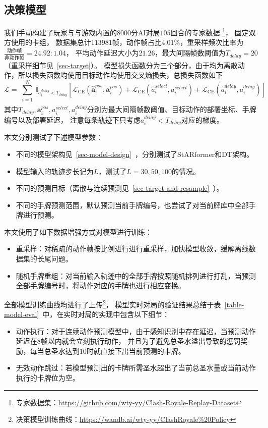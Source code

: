 \documentclass[openany,twoside,nofonts,AutoFakeBold,UTF8]{ctexbook}
\def\bd{\boldsymbol}        %
\begin{document}
\subsection{决策模型}\label{sec-decision-model}
我们手动构建了玩家与与游戏内置的$8000$分AI对局$105$回合的专家数据
\footnote{专家数据集：\url{https://github.com/wty-yy/Clash-Royale-Replay-Dataset}}，
固定双方使用的卡组，
数据集总计$113981$帧，动作帧占比$4.01\%$，重采样频次比率为$\frac{\text{动作帧}}{\text{非动作帧}}=24.92:1.04$，
平均动作延迟大小为$21.26$，最大间隔帧数阈值为$T_{delay}=20$（重采样细节见~\ref{sec-target}）。
模型损失函数分为三个部分，由于均为离散动作，所以损失函数均使用目标动作均使用交叉熵损失，总损失函数如下
\begin{equation}
  \mathcal{L} =
  \sum_{\substack{i=1\\}}^N\mathbb{I}_{a_i^{delay} < T_{delay}}\left[\mathcal{L}_{\text{CE}}(\hat{\bd{a}}_i^{pos}, \bd{a}_i^{pos})+
  \mathcal{L}_{\text{CE}}(\hat{a}_i^{select}, a_i^{select}) + 
  \mathcal{L}_{\text{CE}}(\hat{a}_i^{delay}, a_i^{delay})\right]
\end{equation}
其中$T_{delay},\bd{a}_i^{pos},a_i^{select},a_i^{delay}$分别为最大间隔帧数阈值、目标动作的部署坐标、手牌编号以及部署延迟，
注意每条轨迹下只考虑$a_i^{delay} < T_{delay}$对应的梯度。

本文分别测试了下述模型参数：
\begin{itemize}
  \item 不同的模型架构见~\ref{sec-model-design}~，分别测试了StARformer和DT架构。
  \item 模型输入的轨迹步长记为$L$，测试了$L=30,50,100$的情况。
  \item 不同的预测目标（离散与连续预测见~\ref{sec-target-and-resample}~）。
  \item 不同的手牌预测范围，默认预测当前手牌编号，也尝试了对当前牌库中全部手牌进行预测。
\end{itemize}

本文使用了如下数据增强方式对模型进行训练：
\begin{itemize}
  \item 重采样：对稀疏的动作帧按比例进行进行重采样，加快模型收敛，缓解离线数据集的长尾问题。
  \item 随机手牌重组：对当前输入轨迹中的全部手牌按照随机排列进行打乱，当预测全部手牌编号时，将动作对应的手牌也进行相应变换。
\end{itemize}

全部模型训练曲线均进行了上传\footnote{决策模型训练曲线：\url{https://wandb.ai/wty-yy/ClashRoyale\%20Policy}}，
模型实时对局的验证结果总结于表~\ref{table-model-eval}~中，在实时对局的实现中包含以下细节：
\begin{itemize}
  \item 动作执行：对于连续动作预测模型中，由于感知识别中存在延迟，当预测动作延迟在$8$帧以内就会立刻执行动作，
  并且为了避免总圣水溢出导致的惩罚奖励，每当总圣水达到$10$时就直接下出当前预测的卡牌。
  \item 无效动作跳过：若模型预测出的卡牌所需圣水超出了当前总圣水量或当前动作执行的卡牌位为空。
\end{itemize}
\end{document}
